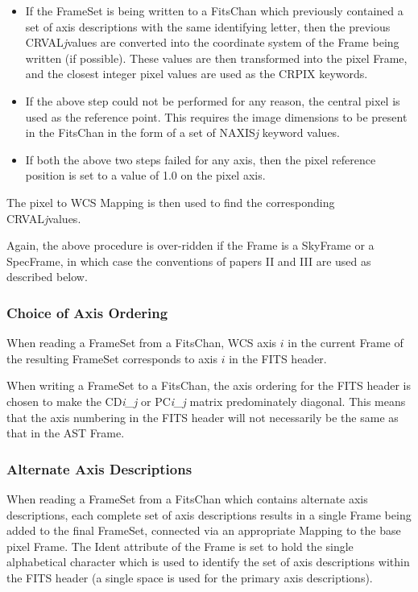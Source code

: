 \documentclass[twoside,11pt]{starlink}
\begin{document}
\begin{itemize}
\item If the FrameSet is being written to a FitsChan which previously
contained a set of axis descriptions with the same identifying letter,
then the previous CRVAL\emph{j}values are converted into the coordinate system
of the Frame being written (if possible). These values are then
transformed into the pixel Frame, and the closest integer pixel values
are used as the CRPIX keywords.
\item If the above step could not be performed for any reason, the
central pixel is used as the reference point. This requires the image
dimensions to be present in the FitsChan in the form of a set of
NAXIS\emph{j} keyword values.
\item If both the above two steps failed for any axis, then the pixel
reference position is set to a value of 1.0 on the pixel axis.
\end{itemize}

The pixel to WCS Mapping is then used to find the corresponding
CRVAL\emph{j}values.

Again, the above procedure is over-ridden if the Frame is a
SkyFrame or a SpecFrame, in which
case the conventions of papers II and III are used as described below.


\subsubsection{Choice of Axis Ordering}
When reading a FrameSet from a
FitsChan, WCS axis $i$ in the current
Frame of the
resulting FrameSet corresponds to axis $i$ in the FITS header.

When writing a FrameSet to a FitsChan, the axis ordering for the FITS
header is chosen to make the CD\emph{i\_j} or PC\emph{i\_j} matrix
predominately diagonal. This means that the axis numbering in the FITS
header will not necessarily be the same as that in the AST Frame.

\subsubsection{Alternate Axis Descriptions}
When reading a FrameSet from a
FitsChan which contains alternate axis descriptions,
each complete set of axis descriptions results in a single Frame being added
to the final FrameSet, connected via an appropriate
Mapping to the base pixel Frame. The Ident attribute of the Frame is set to hold the single alphabetical
character which is used to identify the set of axis descriptions within
the FITS header (a single space is used for the primary axis descriptions).
\end{document}
